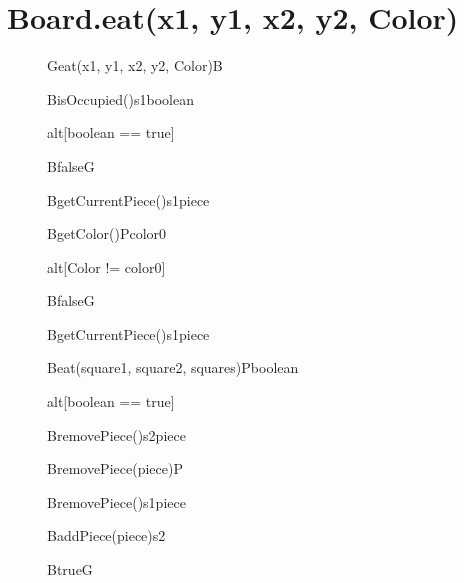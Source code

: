 \documentclass[8pt]{article}
\begin{document}
\section{Board.eat(x1, y1, x2, y2, Color)}
\begin{figure}[H]
	\centering
  	\begin{adjustbox}{width=\textwidth}
		\begin{sequencediagram}
			
			\begin{messcall}{G}{eat(x1, y1, x2, y2, Color)}{B}{}	
				\begin{call}{B}{isOccupied()}{s1}{boolean}
				\end{call}
				\begin{sdblock}{alt}{[boolean == true]}
					\begin{messcall}{B}{false}{G}
					\end{messcall} 					  		
				\end{sdblock}
				
				\begin{call}{B}{getCurrentPiece()}{s1}{piece}
				\end{call}
				\begin{call}{B}{getColor()}{P}{color0}
				\end{call}
				\begin{sdblock}{alt}{[Color != color0]}
					\begin{messcall}{B}{false}{G}
					\end{messcall} 					  		
				\end{sdblock}
				
				\begin{call}{B}{getCurrentPiece()}{s1}{piece}
				\end{call}
				\begin{call}{B}{eat(square1, square2, squares)}{P}{boolean}
				\end{call}
				\begin{sdblock}{alt}{[boolean == true]}
				    \begin{call}{B}{removePiece()}{s2}{piece}
				    \end{call}
				    \begin{messcall}{B}{removePiece(piece)}{P}{}
					\end{messcall}
					\begin{call}{B}{removePiece()}{s1}{piece}
					\end{call}
					\begin{messcall}{B}{addPiece(piece)}{s2}
					\end{messcall}
					\begin{messcall}{B}{true}{G}
					\end{messcall} 	
				\end{sdblock}
				

\end{messcall}
\end{sequencediagram}
\end{adjustbox}
\end{figure}
\end{document}
